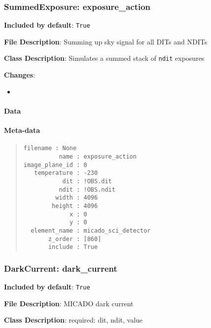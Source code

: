 \subsubsection{SummedExposure: \textquotedbl{}exposure\_action\textquotedbl{}%
  \label{summedexposure-exposure-action}%
}

\textbf{Included by default}: \texttt{True}

\textbf{File Description}: Summing up sky signal for all DITs and NDITs

\textbf{Class Description}: Simulates a summed stack of \texttt{ndit} exposures

\textbf{Changes}:

\begin{itemize}
\item \end{itemize}


\paragraph{Data%
  \label{id3}%
}


\paragraph{Meta-data%
  \label{id4}%
}

\begin{quote}
\begin{alltt}
\begin{lstlisting}[frame=single]
      filename : None
          name : exposure_action
image_plane_id : 0
   temperature : -230
           dit : !OBS.dit
          ndit : !OBS.ndit
         width : 4096
        height : 4096
             x : 0
             y : 0
  element_name : micado_sci_detector
       z_order : [860]
       include : True
\end{lstlisting}
\end{alltt}
\end{quote}


\subsubsection{DarkCurrent: \textquotedbl{}dark\_current\textquotedbl{}%
  \label{darkcurrent-dark-current}%
}

\textbf{Included by default}: \texttt{True}

\textbf{File Description}: MICADO dark current

\textbf{Class Description}: required: dit, ndit, value

